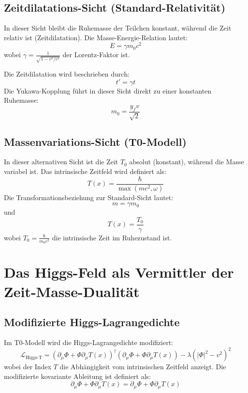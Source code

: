 \documentclass[a4paper,12pt]{article}
\newcommand{\Tfield}{T(x)}
\newcommand{\DhiggsT}{\partial_\mu \Phi + \Phi \partial_\mu \Tfield}
\begin{document}
	\subsection{Zeitdilatations-Sicht (Standard-Relativität)}
	In dieser Sicht bleibt die Ruhemasse der Teilchen konstant, während die Zeit relativ ist (Zeitdilatation). Die Masse-Energie-Relation lautet:
	\begin{equation}
		E = \gamma m_0 c^2
	\end{equation}
	wobei \( \gamma = \frac{1}{\sqrt{1-v^2/c^2}} \) der Lorentz-Faktor ist.
	
	Die Zeitdilatation wird beschrieben durch:
	\begin{equation}
		t' = \gamma t
	\end{equation}
	Die Yukawa-Kopplung führt in dieser Sicht direkt zu einer konstanten Ruhemasse:
	\begin{equation}
		m_0 = \frac{y_f v}{\sqrt{2}}
	\end{equation}
	
	\subsection{Massenvariations-Sicht (T0-Modell)}
	In dieser alternativen Sicht ist die Zeit \( T_0 \) absolut (konstant), während die Masse variabel ist. Das intrinsische Zeitfeld wird definiert als:
	\begin{equation}
		\Tfield = \frac{\hbar}{\max(m c^2, \omega)}
	\end{equation}
	Die Transformationsbeziehung zur Standard-Sicht lautet:
	\begin{equation}
		m = \gamma m_0
	\end{equation}
	und
	\begin{equation}
		\Tfield = \frac{T_0}{\gamma}
	\end{equation}
	wobei \( T_0 = \frac{\hbar}{m_0 c^2} \) die intrinsische Zeit im Ruhezustand ist.
	
	\section{Das Higgs-Feld als Vermittler der Zeit-Masse-Dualität}
	\subsection{Modifizierte Higgs-Lagrangedichte}
	Im T0-Modell wird die Higgs-Lagrangedichte modifiziert:
	\begin{equation}
		\mathcal{L}_{\text{Higgs-T}} = (\DhiggsT)^\dagger (\DhiggsT) - \lambda(|\Phi|^2 - v^2)^2
	\end{equation}
	wobei der Index \( T \) die Abhängigkeit vom intrinsischen Zeitfeld anzeigt. Die modifizierte kovariante Ableitung ist definiert als:
	\begin{equation}
		\DhiggsT = \partial_\mu \Phi + \Phi \partial_\mu \Tfield
	\end{equation}
	
\end{document}
